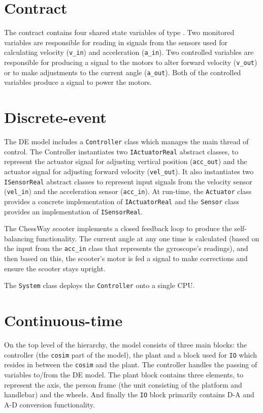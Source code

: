 
\section{Contract} The contract contains four shared state
variables of type {\textbf{}}. Two monitored variables
are responsible for reading in signals from the sensors used for
calculating velocity (\texttt{v\_in}) and acceleration
(\texttt{a\_in}). Two controlled variables are responsible for
producing a signal to the motors to alter forward velocity
(\texttt{v\_out}) or to make adjustments to the current angle
(\texttt{a\_out}). Both of the controlled variables produce a signal
to power the motors.

\section{Discrete-event} The DE model includes a
\texttt{Controller} class which manages the main thread of
control. The Controller instantiates two \texttt{IActuatorReal}
abstract classes, to represent the actuator signal for adjusting
vertical position (\texttt{acc\_out}) and the actuator signal for
adjusting forward velocity (\texttt{vel\_out}). It also instantiates
two \texttt{ISensorReal} abstract classes to represent input signals
from the velocity sensor (\texttt{vel\_in}) and the acceleration
sensor (\texttt{acc\_in}). At run-time, the \texttt{Actuator} class
provides a concrete implementation of \texttt{IActuatorReal} and the
\texttt{Sensor} class provides an implementation of
\texttt{ISensorReal}.

The ChessWay scooter implements a closed feedback loop to produce the
self-balancing functionality. The current angle at any one time is
calculated (based on the input from the \texttt{acc\_in} class that
represents the gyroscope's readings), and then based on this, the
scooter's motor is fed a signal to make corrections and ensure the
scooter stays upright.

The \texttt{System} class deploys the \texttt{Controller} onto a
single CPU.

\section{Continuous-time} On the top level of the hierarchy, the
model consists of three main blocks: the controller (the
\texttt{cosim} part of the model), the plant and a block used for
\texttt{IO} which resides in between the \texttt{cosim} and the
plant. The controller handles the passing of variables to/from the DE
model. The plant block contains three elements, to represent the axis,
the person frame (the unit consisting of the platform and handlebar)
and the wheels. And finally the \texttt{IO} block primarily contains
D-A and A-D conversion functionality.


